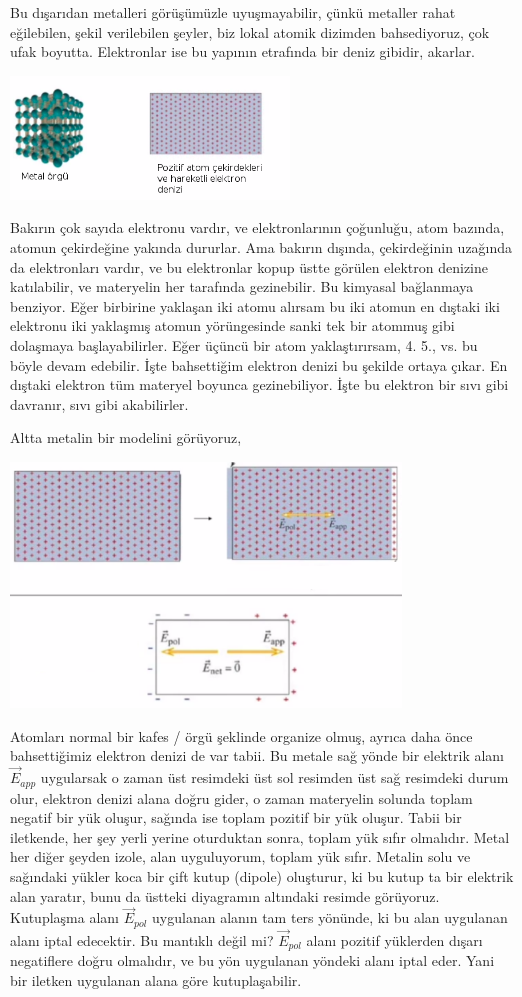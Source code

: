 \documentclass[12pt,fleqn]{article}\usepackage{../../common}
\begin{document}
Bu dışarıdan metalleri görüşümüzle uyuşmayabilir, çünkü metaller rahat
eğilebilen, şekil verilebilen şeyler, biz lokal atomik dizimden
bahsediyoruz, çok ufak boyutta. Elektronlar ise bu yapının etrafında bir
deniz gibidir, akarlar. 

\includegraphics[width=20em]{04_13.png}

Bakırın çok sayıda elektronu vardır, ve elektronlarının çoğunluğu, atom bazında,
atomun çekirdeğine yakında dururlar. Ama bakırın dışında, çekirdeğinin uzağında
da elektronları vardır, ve bu elektronlar kopup üstte görülen elektron denizine
katılabilir, ve materyelin her tarafında gezinebilir. Bu kimyasal bağlanmaya
benziyor. Eğer birbirine yaklaşan iki atomu alırsam bu iki atomun en dıştaki iki
elektronu iki yaklaşmış atomun yörüngesinde sanki tek bir atommuş gibi dolaşmaya
başlayabilirler. Eğer üçüncü bir atom yaklaştırırsam, 4. 5., vs. bu böyle devam
edebilir. İşte bahsettiğim elektron denizi bu şekilde ortaya çıkar. En dıştaki
elektron tüm materyel boyunca gezinebiliyor. İşte bu elektron bir sıvı gibi
davranır, sıvı gibi akabilirler.

Altta metalin bir modelini görüyoruz,

\includegraphics[width=28em]{04_14.png} 

Atomları normal bir kafes / örgü şeklinde organize olmuş, ayrıca daha önce
bahsettiğimiz elektron denizi de var tabii. Bu metale sağ yönde bir elektrik
alanı $\vec{E}_{app}$ uygularsak o zaman üst resimdeki üst sol resimden üst sağ
resimdeki durum olur, elektron denizi alana doğru gider, o zaman materyelin
solunda toplam negatif bir yük oluşur, sağında ise toplam pozitif bir yük
oluşur. Tabii bir iletkende, her şey yerli yerine oturduktan sonra, toplam yük
sıfır olmalıdır. Metal her diğer şeyden izole, alan uyguluyorum, toplam yük
sıfır. Metalin solu ve sağındaki yükler koca bir çift kutup (dipole) oluşturur,
ki bu kutup ta bir elektrik alan yaratır, bunu da üstteki diyagramın altındaki
resimde görüyoruz. Kutuplaşma alanı $\vec{E}_{pol}$ uygulanan alanın tam ters
yönünde, ki bu alan uygulanan alanı iptal edecektir.  Bu mantıklı değil mi?
$\vec{E}_{pol}$ alanı pozitif yüklerden dışarı negatiflere doğru olmalıdır, ve
bu yön uygulanan yöndeki alanı iptal eder. Yani bir iletken uygulanan alana göre
kutuplaşabilir.
\end{document}

